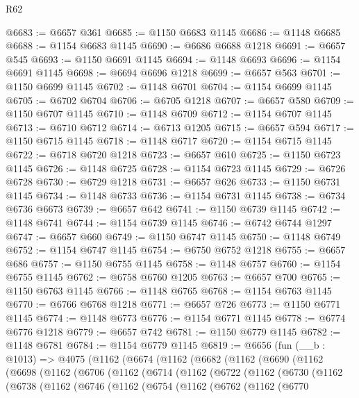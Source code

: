 \begin{lexlean}{R62}
\begin{coremodule}
@6683 := @6657 @361
@6685 := @1150 @6683 @1145
@6686 := @1148 @6685
@6688 := @1154 @6683 @1145
@6690 := @6686 @6688 @1218
@6691 := @6657 @545
@6693 := @1150 @6691 @1145
@6694 := @1148 @6693
@6696 := @1154 @6691 @1145
@6698 := @6694 @6696 @1218
@6699 := @6657 @563
@6701 := @1150 @6699 @1145
@6702 := @1148 @6701
@6704 := @1154 @6699 @1145
@6705 := @6702 @6704
@6706 := @6705 @1218
@6707 := @6657 @580
@6709 := @1150 @6707 @1145
@6710 := @1148 @6709
@6712 := @1154 @6707 @1145
@6713 := @6710 @6712
@6714 := @6713 @1205
@6715 := @6657 @594
@6717 := @1150 @6715 @1145
@6718 := @1148 @6717
@6720 := @1154 @6715 @1145
@6722 := @6718 @6720 @1218
@6723 := @6657 @610
@6725 := @1150 @6723 @1145
@6726 := @1148 @6725
@6728 := @1154 @6723 @1145
@6729 := @6726 @6728
@6730 := @6729 @1218
@6731 := @6657 @626
@6733 := @1150 @6731 @1145
@6734 := @1148 @6733
@6736 := @1154 @6731 @1145
@6738 := @6734 @6736 @6673
@6739 := @6657 @642
@6741 := @1150 @6739 @1145
@6742 := @1148 @6741
@6744 := @1154 @6739 @1145
@6746 := @6742 @6744 @1297
@6747 := @6657 @660
@6749 := @1150 @6747 @1145
@6750 := @1148 @6749
@6752 := @1154 @6747 @1145
@6754 := @6750 @6752 @1218
@6755 := @6657 @686
@6757 := @1150 @6755 @1145
@6758 := @1148 @6757
@6760 := @1154 @6755 @1145
@6762 := @6758 @6760 @1205
@6763 := @6657 @700
@6765 := @1150 @6763 @1145
@6766 := @1148 @6765
@6768 := @1154 @6763 @1145
@6770 := @6766 @6768 @1218
@6771 := @6657 @726
@6773 := @1150 @6771 @1145
@6774 := @1148 @6773
@6776 := @1154 @6771 @1145
@6778 := @6774 @6776 @1218
@6779 := @6657 @742
@6781 := @1150 @6779 @1145
@6782 := @1148 @6781
@6784 := @1154 @6779 @1145
@6819 := @6656
    (fun (__b : @1013) =>
    @4075
      (@1162
        (@6674
          (@1162
            (@6682
              (@1162
                (@6690
                  (@1162
                    (@6698
                      (@1162
                        (@6706
                          (@1162
                            (@6714
                              (@1162
                                (@6722
                                  (@1162
                                    (@6730
                                      (@1162
                                        (@6738
                                          (@1162
                                            (@6746
                                              (@1162
                                                (@6754
                                                  (@1162
                                                    (@6762
                                                      (@1162
                                                        (@6770

\end{coremodule}
\end{lexlean}
